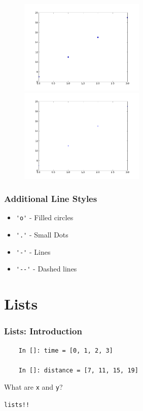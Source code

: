 \documentclass[14pt,compress]{beamer}
\newcounter{time}
\newcommand{\typ}[1]{\lstinline{#1}}
\begin{document}
\begin{frame}[fragile]
\begin{figure}
\includegraphics[interpolate=true,width=2.35in]{data/stline_dots.png}
\includegraphics[interpolate=true,width=2.35in]{data/stline_points.png}
\end{figure}
\end{frame}

\begin{frame}[fragile]
\frametitle{Additional Line Styles}
\begin{itemize}
  \item \typ{'o'} - Filled circles
  \item \typ{'.'} - Small Dots
  \item \typ{'-'} - Lines
  \item \typ{'--'} - Dashed lines
\end{itemize}
\end{frame}

\section{Lists}
\begin{frame}[fragile]
  \frametitle{Lists: Introduction}
  \begin{lstlisting}
    In []: time = [0, 1, 2, 3]

    In []: distance = [7, 11, 15, 19]

  \end{lstlisting}
What are \typ{x} and \typ{y}?\\
\begin{center}
\alert{\typ{lists!!}}
\end{center}
\end{frame}
\end{document}
